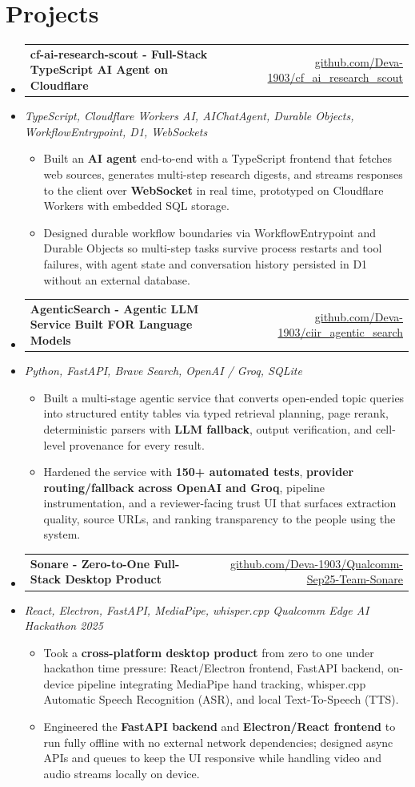 \documentclass[letterpaper,10pt]{article}
\makeatletter
\newcommand{\resumeItem}[1]{
  \item\small{#1\vspace{-1pt}}
}
\newcommand{\resumeProjectHeading}[2]{
    \item
    \begin{tabular*}{0.985\textwidth}[t]{l@{\extracolsep{\fill}}r}
      \small\textbf{#1} & \small #2 \\
    \end{tabular*}\vspace{-5pt}
}
\newcommand{\resumeProjectSubheading}[1]{
  \vspace{-2pt}\item[] {\small\textcolor{ResumeSlate}{\emph{#1}}}\vspace{-3pt}
}
\newcommand{\resumeSubHeadingListStart}{\begin{itemize}[leftmargin=0.0in, label={}, itemsep=2pt, topsep=2pt]}
\newcommand{\resumeSubHeadingListEnd}{\end{itemize}}
\newcommand{\resumeItemListStart}{\begin{itemize}[leftmargin=0.18in, itemsep=2pt, topsep=1pt]}
\newcommand{\resumeItemListEnd}{\end{itemize}\vspace{-4pt}}
\makeatother
\begin{document}
\section{Projects}
\resumeSubHeadingListStart
  \resumeProjectHeading
    {cf-ai-research-scout - Full-Stack TypeScript AI Agent on Cloudflare}
    {\href{https://github.com/Deva-1903/cf_ai_research_scout}{github.com/Deva-1903/cf\_ai\_research\_scout}}
  \resumeProjectSubheading{TypeScript, Cloudflare Workers AI, AIChatAgent, Durable Objects, WorkflowEntrypoint, D1, WebSockets}
    \resumeItemListStart
      \resumeItem{Built an \textbf{AI agent} end-to-end with a TypeScript frontend that fetches web sources, generates multi-step research digests, and streams responses to the client over \textbf{WebSocket} in real time, prototyped on Cloudflare Workers with embedded SQL storage.}
      \resumeItem{Designed durable workflow boundaries via WorkflowEntrypoint and Durable Objects so multi-step tasks survive process restarts and tool failures, with agent state and conversation history persisted in D1 without an external database.}
    \resumeItemListEnd
  \resumeProjectHeading
    {AgenticSearch - Agentic LLM Service Built FOR Language Models}
    {\href{https://github.com/Deva-1903/ciir_agentic_search}{github.com/Deva-1903/ciir\_agentic\_search}}
  \resumeProjectSubheading{Python, FastAPI, Brave Search, OpenAI / Groq, SQLite}
    \resumeItemListStart
      \resumeItem{Built a multi-stage agentic service that converts open-ended topic queries into structured entity tables via typed retrieval planning, page rerank, deterministic parsers with \textbf{LLM fallback}, output verification, and cell-level provenance for every result.}
      \resumeItem{Hardened the service with \textbf{150+ automated tests}, \textbf{provider routing/fallback across OpenAI and Groq}, pipeline instrumentation, and a reviewer-facing trust UI that surfaces extraction quality, source URLs, and ranking transparency to the people using the system.}
    \resumeItemListEnd
  \resumeProjectHeading
    {Sonare - Zero-to-One Full-Stack Desktop Product}
    {\href{https://github.com/Deva-1903/Qualcomm-Sep25-Team-Sonare}{github.com/Deva-1903/Qualcomm-Sep25-Team-Sonare}}
  \resumeProjectSubheading{React, Electron, FastAPI, MediaPipe, whisper.cpp \enspace\textbar\enspace Qualcomm Edge AI Hackathon 2025}
    \resumeItemListStart
      \resumeItem{Took a \textbf{cross-platform desktop product} from zero to one under hackathon time pressure: React/Electron frontend, FastAPI backend, on-device pipeline integrating MediaPipe hand tracking, whisper.cpp Automatic Speech Recognition (ASR), and local Text-To-Speech (TTS).}
      \resumeItem{Engineered the \textbf{FastAPI backend} and \textbf{Electron/React frontend} to run fully offline with no external network dependencies; designed async APIs and queues to keep the UI responsive while handling video and audio streams locally on device.}
    \resumeItemListEnd
\resumeSubHeadingListEnd
\vspace{-4pt}
\end{document}
